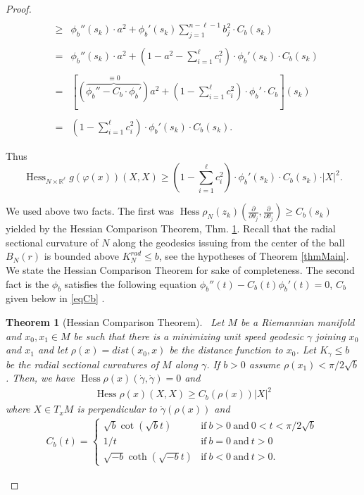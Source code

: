 \documentclass[a4paper]{amsart}
\newtheorem{theorem}{Theorem}
\begin{document}
\begin{proof}
\begin{eqnarray}
&&\nonumber \\
&\geq &\!\phi_{b}''(s_k)\cdot   a^2+ \phi_{b}'(s_k)\sum_{j=1}^{n-\ell-1}\!b_j^{2}\cdot C_{b}(s_k)\nonumber\\
&&\nonumber \\
&=& \phi_{b}''(s_k)\cdot a^2+   (1-a^2 - \sum_{i=1}^{\ell}\!c_i^{2})\cdot \phi_{b}'(s_k)\cdot C_{b}(s_k)\nonumber \\
&& \nonumber \\
&=& \left[\stackrel{\equiv 0}{(\overbrace{\phi_{b}''-C_{b}\cdot \phi_{b}'})}a^2 + (1- \sum_{i=1}^{\ell}\!c_i^{2})\cdot \phi_{b}'\cdot C_{b}\right](s_k) \nonumber\\
&&\nonumber \\
&=& (1- \sum_{i=1}^{\ell}\!c_i^{2})\cdot \phi_{b}'(s_k)\cdot C_{b}(s_k).\nonumber
\end{eqnarray}

Thus \begin{equation}\label{eqHessiano7}\operatorname{Hess}_{N\times \mathbb{R}^{\ell}} g(\varphi (x))(X,X)\geq (1- \sum_{i=1}^{\ell}\!c_i^{2})\cdot \phi_{b}'(s_k)\cdot C_{b}(s_k)\cdot \vert X\vert^{2}.\end{equation}

We used  above two facts.  The first was $\operatorname{Hess} \rho_{N}(z_k)(\frac{\partial}{\partial \theta_{j}},\frac{\partial}{\partial \theta_{j}})\geq C_{b}(s_{k})$ yielded by  the Hessian Comparison Theorem, Thm. \ref{thmHessiano}. Recall that the radial sectional curvature of $N$ along the geodesics issuing from the center of  the ball $B_{N}(r)$ is bounded above $K_{N}^{rad}\leq b$, see the hypotheses of Theorem \ref{thmMain}. We state  the Hessian Comparison Theorem for sake of completeness.
 The second fact is the $\phi_{b}$ satisfies the following equation $ \phi_{b}''(t)-C_{b}(t)\phi_{b}'(t)=0$, $C_{b}$ given below in \eqref{eqCb} .
\begin{theorem}[Hessian Comparison Theorem] \ Let $ M $ be a Riemannian manifold and $ x_{0},x_{1} \in M $ be such that there is a minimizing unit speed geodesic $ \gamma $ joining $x_0 $ and $ x_1 $ and let $\rho(x) = dist(x_{0},x) $ be the distance function to $ x_0 $. Let $ K_{\gamma} \leq b $ be the radial sectional curvatures of $ M $ along $ \gamma $. If $ b > 0 $ assume $ \rho(x_{1}) < \pi/2\sqrt{b} $. Then, we have $ \operatorname{Hess}\rho(x)(\dot{\gamma},\dot{\gamma}) = 0 $ and
\begin{eqnarray}
\operatorname{Hess} \rho(x)(X,X) \geq C_{b}(\rho(x))\vert X\vert^2
\end{eqnarray}
where $ X \in T_{x}M $ is perpendicular to $ \dot{\gamma}(\rho(x)) $ and
\begin{eqnarray}\label{eqCb}
C_{b}(t) =
\left\{\begin{array}{ll}
\sqrt{b}\cot(\sqrt{b}t) & \mbox{if} \ b > 0 \ \mbox{and} \ 0 < t < \pi/2\sqrt{b} \\
1/t & \mbox{if} \ b = 0 \ \mbox{and} \ t > 0 \\
\sqrt{-b}\coth(\sqrt{-b}t) & \mbox{if} \ b < 0 \ \mbox{and} \ t > 0.
\end{array}\right.
\end{eqnarray}\label{thmHessiano}
\end{theorem}


\end{proof}
\end{document}
